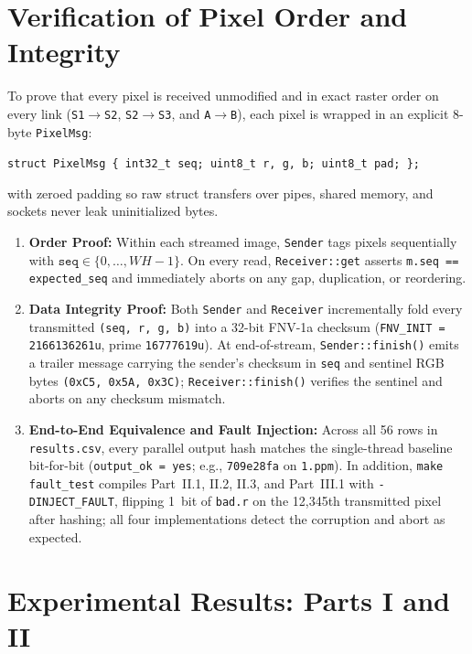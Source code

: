 \documentclass[10pt,a4paper]{article}
\begin{document}
\section{Verification of Pixel Order and Integrity}

To prove that every pixel is received unmodified and in exact raster order on every link (\texttt{S1$\to$S2}, \texttt{S2$\to$S3}, and \texttt{A$\to$B}), each pixel is wrapped in an explicit 8-byte \texttt{PixelMsg}:
\begin{center}
\texttt{struct PixelMsg \{ int32\_t seq; uint8\_t r, g, b; uint8\_t pad; \};}
\end{center}
with zeroed padding so raw struct transfers over pipes, shared memory, and sockets never leak uninitialized bytes.

\begin{enumerate}
    \item \textbf{Order Proof:} Within each streamed image, \texttt{Sender} tags pixels sequentially with $\texttt{seq} \in \{0, \dots, WH-1\}$. On every read, \texttt{Receiver::get} asserts \texttt{m.seq == expected\_seq} and immediately aborts on any gap, duplication, or reordering.
    \item \textbf{Data Integrity Proof:} Both \texttt{Sender} and \texttt{Receiver} incrementally fold every transmitted \texttt{(seq, r, g, b)} into a 32-bit FNV-1a checksum (\texttt{FNV\_INIT = 2166136261u}, prime \texttt{16777619u}). At end-of-stream, \texttt{Sender::finish()} emits a trailer message carrying the sender's checksum in \texttt{seq} and sentinel RGB bytes \texttt{(0xC5, 0x5A, 0x3C)}; \texttt{Receiver::finish()} verifies the sentinel and aborts on any checksum mismatch.
    \item \textbf{End-to-End Equivalence and Fault Injection:} Across all 56 rows in \texttt{results.csv}, every parallel output hash matches the single-thread baseline bit-for-bit (\texttt{output\_ok = yes}; e.g., \texttt{709e28fa} on \texttt{1.ppm}). In addition, \texttt{make fault\_test} compiles Part~II.1, II.2, II.3, and Part~III.1 with \texttt{-DINJECT\_FAULT}, flipping 1~bit of \texttt{bad.r} on the 12{,}345th transmitted pixel after hashing; all four implementations detect the corruption and abort as expected.
\end{enumerate}

\section{Experimental Results: Parts I and II}
\end{document}
